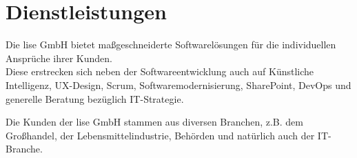 \section{Dienstleistungen}\label{sec:dienstleistungen}
Die lise GmbH bietet maßgeschneiderte Softwarelösungen für die individuellen Ansprüche ihrer Kunden.\\  
Diese erstrecken sich neben der Softwareentwicklung auch auf Künstliche Intelligenz, UX-Design, Scrum,  
Softwaremodernisierung, SharePoint, DevOps und generelle Beratung bezüglich IT-Strategie. \autocite[/ueber-uns/unternehmen]{LiseWeb}  

Die Kunden der lise GmbH stammen aus diversen Branchen, z.B. dem Großhandel, der Lebensmittelindustrie, Behörden und natürlich auch der IT-Branche.






